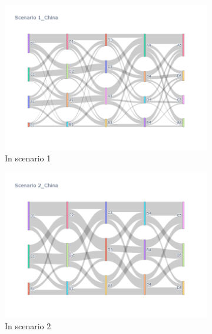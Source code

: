 \begin{figure}[h]
  \begin{subfigure}{0.5\textwidth}
    \centering
    \includegraphics[width=\textwidth]{Figure/figure36a.png}
    \caption{In scenario 1}
    \label{fig36a}
  \end{subfigure}
  \begin{subfigure}{0.5\textwidth}
    \centering
    \includegraphics[width=\linewidth]{Figure/figure36b.png}
    \caption{In scenario 2}
    \label{fig36b}
  \end{subfigure}
  \begin{subfigure}{0.5\textwidth}
    \centering

\end{subfigure}
\end{figure}

